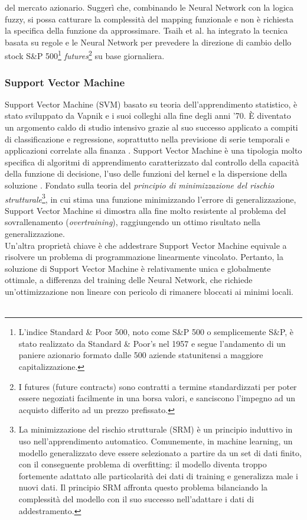 \documentclass[a4paper,12pt]{report}
\begin{document}
del mercato azionario. Suggerì che, combinando le Neural Network con la logica fuzzy, si possa catturare la complessità del mapping funzionale e non è richiesta la specifica della funzione da approssimare. Tsaih et al. \cite{41} ha integrato la tecnica basata su regole e le Neural Network per prevedere la direzione di cambio dello stock S\&P 500\footnote{L'indice Standard \& Poor 500, noto come S\&P 500 o semplicemente S\&P, è stato realizzato da Standard \& Poor's nel 1957 e segue l'andamento di un paniere azionario formato dalle 500 aziende statunitensi a maggiore capitalizzazione.} \textit{futures}\footnote{I futures (future contracts) sono contratti a termine standardizzati per poter essere negoziati facilmente in una borsa valori, e sanciscono l'impegno ad un acquisto differito ad un prezzo prefissato. } su base giornaliera.

\subsubsection{Support Vector Machine}
Support Vector Machine (SVM) basato su teoria dell'apprendimento statistico, è stato sviluppato da Vapnik \cite{44} e i suoi colleghi alla fine degli anni '70. È diventato un argomento caldo di studio intensivo grazie al suo successo applicato a compiti di classificazione e regressione, soprattutto nella previsione di serie temporali e applicazioni correlate alla finanza \cite{46}. Support Vector Machine è una tipologia molto specifica di algoritmi di apprendimento caratterizzato dal controllo della capacità della funzione di decisione, l'uso delle funzioni del kernel e la dispersione della soluzione \cite{43}. Fondato sulla teoria del \textit{principio di minimizzazione del rischio strutturale}\footnote{La minimizzazione del rischio strutturale (SRM) è un principio induttivo in uso nell'apprendimento automatico. Comunemente, in machine learning, un modello generalizzato deve essere selezionato a partire da un set di dati finito, con il conseguente problema di overfitting: il modello diventa troppo fortemente adattato alle particolarità dei dati di training e generalizza male i nuovi dati. Il principio SRM affronta questo problema bilanciando la complessità del modello con il suo successo nell'adattare i dati di addestramento.}, in cui stima una funzione minimizzando l'errore di generalizzazione, Support Vector Machine si dimostra alla fine molto resistente al problema del sovrallenamento (\textit{overtraining}), raggiungendo un ottimo risultato nella generalizzazione.\\ Un'altra proprietà chiave è che addestrare Support Vector Machine equivale a risolvere un problema di programmazione linearmente vincolato. Pertanto, la soluzione di Support Vector Machine è relativamente unica e globalmente ottimale, a differenza del training delle Neural Network, che richiede un'ottimizzazione non lineare con pericolo di rimanere bloccati ai minimi locali.\\~\\ 
\end{document}
